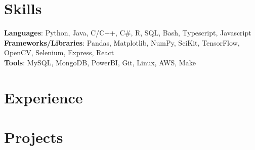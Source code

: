 \documentclass[letterpaper,11pt]{article}
\newcommand{\resumeSubHeadingListStart}{\begin{itemize}[leftmargin=0.15in, label={}]}
\newcommand{\resumeSubHeadingListEnd}{\end{itemize}}
\begin{document}


\section{Skills}
 \begin{itemize}[leftmargin=0.15in, label={}]
    \small{\item{
     \textbf{Languages}{: Python, Java, C/C++, C\#, R, SQL, Bash, Typescript, Javascript} \\
     \textbf{Frameworks/Libraries}{: Pandas, Matplotlib, NumPy, SciKit, TensorFlow, OpenCV, Selenium, Express, React} \\
     \textbf{Tools}{: MySQL, MongoDB, PowerBI, Git, Linux, AWS, Make} \\
    }}
 \end{itemize}


\section{Experience}
  \resumeSubHeadingListStart
      
  \resumeSubHeadingListEnd


\section{Projects}
  \resumeSubHeadingListStart

  
    
  
  
  
  
  
  
  
  \resumeSubHeadingListEnd
  
% 







\end{document}
